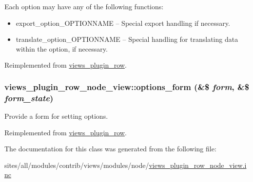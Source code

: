  Each option may have any of the following functions:\begin{itemize}
\item export\_\-option\_\-OPTIONNAME -- Special export handling if necessary.\item translate\_\-option\_\-OPTIONNAME -- Special handling for translating data within the option, if necessary. \end{itemize}


Reimplemented from \hyperlink{classviews__plugin__row_ad6be1492eae8605e9aff37da9f19337}{views\_\-plugin\_\-row}.\hypertarget{classviews__plugin__row__node__view_7bc31b38a1cc4474695af3a564fde775}{
\subsubsection[{options\_\-form}]{\setlength{\rightskip}{0pt plus 5cm}views\_\-plugin\_\-row\_\-node\_\-view::options\_\-form (\&\$ {\em form}, \/  \&\$ {\em form\_\-state})}}
\label{classviews__plugin__row__node__view_7bc31b38a1cc4474695af3a564fde775}


Provide a form for setting options. 

Reimplemented from \hyperlink{classviews__plugin__row_6914c39d64977a0aa71da39cc1af004e}{views\_\-plugin\_\-row}.

The documentation for this class was generated from the following file:\begin{CompactItemize}
\item 
sites/all/modules/contrib/views/modules/node/\hyperlink{views__plugin__row__node__view_8inc}{views\_\-plugin\_\-row\_\-node\_\-view.inc}\end{CompactItemize}
